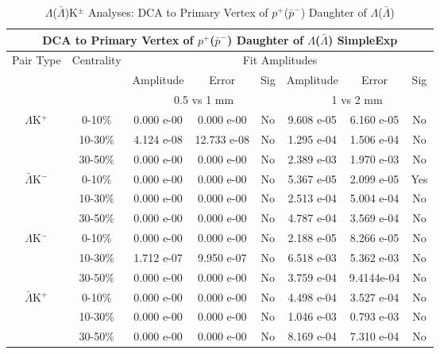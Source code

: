 \documentclass[../AnalysisNoteJBuxton.tex]{subfiles}
\begin{document}
\begin{table}
 \centering
 \begin{tabular}{|c|c|c|c|c||c|c|c|}
  \multicolumn{8}{c}{DCA to Primary Vertex of $p^{+}$($\bar{p}^{-}$) Daughter of $\Lambda$($\bar{\Lambda}$) SimpleExp} \\
  \hline
  \multirow{3}{*}{Pair Type} & \multirow{3}{*}{Centrality} & \multicolumn{6}{c|}{Fit Amplitudes} \\
  \cline{3-8}
   & & Amplitude & Error & Sig & Amplitude & Error & Sig \\  
  \cline{3-8}
   & & \multicolumn{3}{c||}{0.5 vs 1 mm} & \multicolumn{3}{c|}{1 vs 2 mm} \\  
  \hline
  \multirow{3}{*}{$\Lambda$K$^{+}$}
   &  0-10\% & 0.000 e-00 & 0.000 e-00 & No & 9.608 e-05 & 6.160 e-05 & No \\
   & 10-30\% & 4.124 e-08 & 12.733 e-08 & No & 1.295 e-04 & 1.506 e-04 & No \\
   & 30-50\% & 0.000 e-00 & 0.000 e-00 & No & 2.389 e-03 & 1.970 e-03 & No \\
  \hline
  \multirow{3}{*}{$\bar{\Lambda}$K$^{-}$}
   &  0-10\% & 0.000 e-00 & 0.000 e-00 & No & 5.367 e-05 & 2.099 e-05 & Yes \\
   & 10-30\% & 0.000 e-00 & 0.000 e-00 & No & 2.513 e-04 & 5.004 e-04 & No \\
   & 30-50\% & 0.000 e-00 & 0.000 e-00 & No & 4.787 e-04 & 3.569 e-04 & No \\
  \hline \hline
  \multirow{3}{*}{$\Lambda$K$^{-}$}
   &  0-10\% & 0.000 e-00 & 0.000 e-00 & No & 2.188 e-05 & 8.266 e-05 & No \\
   & 10-30\% & 1.712 e-07 & 9.950 e-07 & No & 6.518 e-03 & 5.362 e-03 & No \\
   & 30-50\% & 0.000 e-00 & 0.000 e-00 & No & 3.759 e-04 & 9.4144e-04 & No \\
  \hline
  \multirow{3}{*}{$\bar{\Lambda}$K$^{+}$}
   &  0-10\% & 0.000 e-00 & 0.000 e-00 & No & 4.498 e-04 & 3.527 e-04 & No \\
   & 10-30\% & 0.000 e-00 & 0.000 e-00 & No & 1.046 e-03 & 0.793 e-03 & No \\
   & 30-50\% & 0.000 e-00 & 0.000 e-00 & No & 8.169 e-04 & 7.310 e-04 & No \\
  \hline
 \end{tabular}
 \caption{$\Lambda$($\bar{\Lambda}$)K$^{\pm}$ Analyses: DCA to Primary Vertex of $p^{+}$($\bar{p}^{-}$) Daughter of $\Lambda$($\bar{\Lambda}$)}
 \label{tab:DcaToPrimVertexProtonDaughtOfLamLamKch_SimpleExp}
\end{table}
\end{document}
